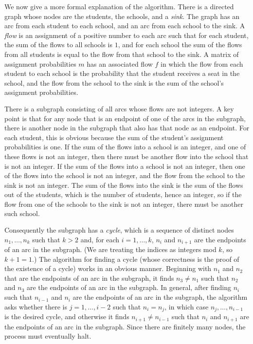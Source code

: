 \documentclass[12pt]{article}
\theoremstyle{definition}
\begin{document}
We now give a more formal explanation of the algorithm.  There is a
directed graph whose nodes are the students, the schools, and a
\emph{sink}.  The graph has an arc from each student to each school,
and an arc from each school to the sink.  A \emph{flow} is an
assignment of a positive number to each arc such that for each
student, the sum of the flows to all schools is $1$, and for each
school the sum of the flows from all students is equal to the flow
from that school to the sink.  A matrix of assignment probabilities
$m$ has an associated flow $f$ in which the flow from each student to
each school is the probability that the student receives a seat in the
school, and the flow from the school to the sink is the sum of the
school's assignment probabilities.

There is a subgraph consisting of all arcs whose flows are not
integers.  A key point is that for any node that is an endpoint of one
of the arcs in the subgraph, there is another node in the subgraph
that also has that node as an endpoint.  For each student, this is
obvious because the sum of the student's assignment probabilities is
one.  If the sum of the flows into a school is an integer, and one of
these flows is not an integer, then there must be another flow into
the school that is not an integer.  If the sum of the flows into a
school is not an integer, then one of the flows into the school is not
an integer, and the flow from the school to the sink is not an
integer.  The sum of the flows into the sink is the sum of the flows
out of the students, which is the number of students, hence an
integer, so if the flow from one of the schools to the sink is not an
integer, there must be another such school.

Consequently the subgraph has a \emph{cycle}, which is a sequence of
distinct nodes $n_1, \ldots, n_k$ such that $k > 2$ and, for each $i =
1, \ldots, k$, $n_i$ and $n_{i+1}$ are the endpoints of an arc in the
subgraph.  (We are treating the indices as integers mod $k$, so $k + 1
= 1$.)  The algorithm for finding a cycle (whose correctness is the
proof of the existence of a cycle) works in an obvious manner.
Beginning with $n_1$ and $n_2$ that are the endpoints of an arc in the
subgraph, it finds $n_3 \ne n_1$ such that $n_2$ and $n_3$ are the
endpoints of an arc in the subgraph.  In general, after finding $n_i$
such that $n_{i-1}$ and $n_i$ are the endpoints of an arc in the
subgraph, the algorithm asks whether there is $j = 1, \ldots, i-2$
such that $n_i = n_j$, in which case $n_j, \ldots, n_{i-1}$ is the
desired cycle, and otherwise it finds $n_{i+1} \ne n_{i-1}$ such that
$n_i$ and $n_{i+1}$ are the endpoints of an arc in the subgraph.
Since there are finitely many nodes, the process must eventually halt.
\end{document}
